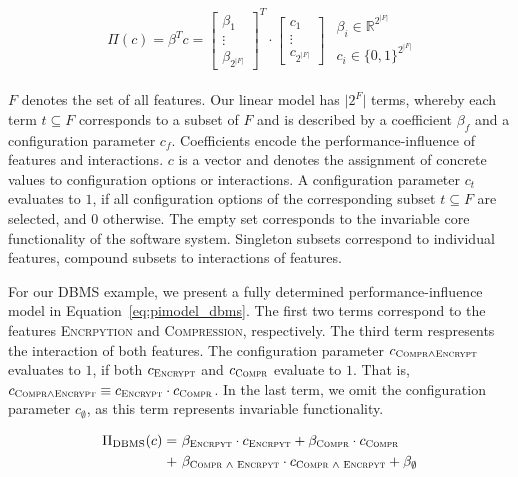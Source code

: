 \documentclass[sigconf]{acmart}
\begin{document}
	\begin{align} \label{eq:pimodel}
		\begin{split}
		\Pi(c) = \beta^T c =  \begin{bmatrix}
		\beta_1\\
		\vdots \\
		\beta_{2^{\vert F\vert}}
		\end{bmatrix}^T \cdot \begin{bmatrix}
		c_1\\
		\vdots \\
		c_{2^{\vert F\vert}}
		\end{bmatrix}
		\end{split}
		\begin{split}
		\beta_i \in \mathbb{R}^{2^{|F|}}\\
		c_i \in \lbrace 0,1\rbrace^{2^{|F|}}
		\end{split}
	\end{align}
	
	$F$ denotes the set of all features. Our linear model has $\vert 2^F\vert$ terms, whereby each term $t \subseteq F$ corresponds to a subset of $F$ and is described by a coefficient $\beta_f$ and a configuration parameter $c_f$.
	Coefficients encode the performance-influence of features and interactions. $c$ is a vector and denotes the assignment of concrete values to configuration options or interactions. A configuration parameter $c_t$ evaluates to $1$, if all configuration options of the corresponding subset $t \subseteq F$ are selected, and $0$ otherwise. The empty set corresponds to the invariable core functionality of the software system. Singleton subsets correspond to individual features, compound subsets to interactions of features.
	
	For our DBMS example, we present a fully determined performance-influence model in Equation~\ref{eq:pimodel_dbms}. The first two terms correspond to the features \textsc{Encrpytion} and \textsc{Compression}, respectively. The third term respresents the interaction of both features. The configuration parameter $c_{\textsc{Compr}\land\textsc{Encrypt}}$ evaluates to $1$, if both $c_{\textsc{Encrypt}}$ and $c_{\textsc{Compr}}$ evaluate to $1$.
	That is, $c_{\textsc{Compr}\land\textsc{Encrypt}} \equiv c_{\textsc{Encrypt}} \cdot c_{\textsc{Compr}}$. In the last term, we omit the configuration parameter $c_\emptyset$, as this term represents invariable functionality.
	
	\begin{align} \label{eq:pimodel_dbms}
	\begin{split}
	\Pi_{\text{DBMS}}(c) =&~\beta_{\textsc{Encrpyt}} \cdot c_{\textsc{Encrpyt}} + \beta_{\textsc{Compr}} \cdot c_{\textsc{Compr}} \\
	+&~ \beta_{\textsc{Compr\ $\land$\ Encrpyt}} \cdot c_{\textsc{Compr\ $\land$\ Encrpyt}}
	+ \beta_{\emptyset}
	\end{split}
	\end{align}
	
\end{document}
